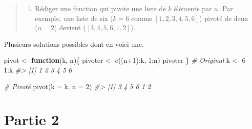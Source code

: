 \documentclass[
]{book}
\newenvironment{Shaded}{}{}
\newcommand{\AttributeTok}[1]{#1}
\newcommand{\CommentTok}[1]{\textit{#1}}
\newcommand{\ControlFlowTok}[1]{\textbf{#1}}
\newcommand{\DecValTok}[1]{#1}
\newcommand{\FunctionTok}[1]{#1}
\newcommand{\NormalTok}[1]{#1}
\newcommand{\OtherTok}[1]{#1}
\newcommand{\SpecialCharTok}[1]{#1}
\providecommand{\tightlist}{%
  \setlength{\itemsep}{0pt}\setlength{\parskip}{0pt}}
\begin{document}
\begin{quote}
\begin{enumerate}
\def\labelenumi{\arabic{enumi}.}
\setcounter{enumi}{5}
\tightlist
\item
  Rédiger une fonction qui pivote une liste de \(k\) éléments par \(n\). Par exemple, une liste de six (\(k=6\) comme \([1,2,3,4,5,6]\)) pivoté de deux (\(n=2\)) devient (\([3,4,5,6,1,2]\)).
\end{enumerate}
\end{quote}

Plusieurs solutions possibles dont en voici une.

\begin{Shaded}
\begin{Highlighting}[]
\NormalTok{pivot }\OtherTok{\textless{}{-}} \ControlFlowTok{function}\NormalTok{(k, n)\{}
\NormalTok{  pivoter }\OtherTok{\textless{}{-}} \FunctionTok{c}\NormalTok{((n}\SpecialCharTok{+}\DecValTok{1}\NormalTok{)}\SpecialCharTok{:}\NormalTok{k, }\DecValTok{1}\SpecialCharTok{:}\NormalTok{n)}
\NormalTok{  pivoter}
\NormalTok{\}}
\CommentTok{\# Original}
\NormalTok{k }\OtherTok{\textless{}{-}} \DecValTok{6}
\DecValTok{1}\SpecialCharTok{:}\NormalTok{k}
\CommentTok{\#\textgreater{} [1] 1 2 3 4 5 6}

\CommentTok{\# Pivoté}
\FunctionTok{pivot}\NormalTok{(}\AttributeTok{k =}\NormalTok{ k, }\AttributeTok{n =} \DecValTok{2}\NormalTok{)}
\CommentTok{\#\textgreater{} [1] 3 4 5 6 1 2}
\end{Highlighting}
\end{Shaded}

\hypertarget{partie-2}{%
\section*{Partie 2}\label{partie-2}}

\printbibliography
\end{document}
